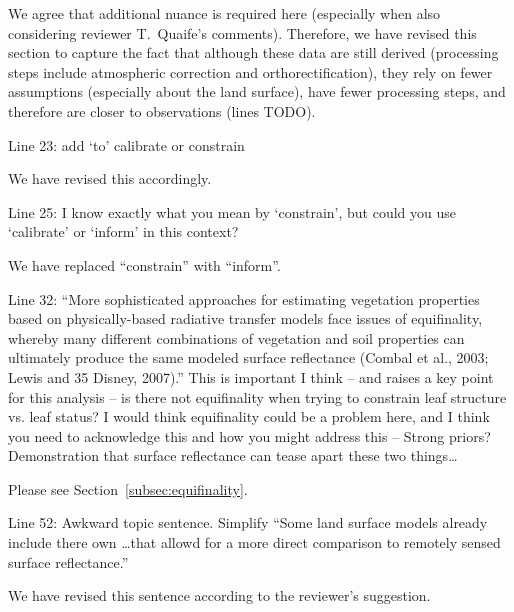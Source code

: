 We agree that additional nuance is required here (especially when also considering reviewer T.\ Quaife’s comments).
Therefore, we have revised this section to capture the fact that although these data are still derived (processing steps include atmospheric correction and orthorectification), they rely on fewer assumptions (especially about the land surface), have fewer processing steps, and therefore are closer to observations (lines TODO).

\begin{reviewer}
  Line 23: add ‘to’ calibrate or constrain
\end{reviewer}

We have revised this accordingly.

\begin{reviewer}
  Line 25: I know exactly what you mean by ‘constrain’, but could you use ‘calibrate’ or ‘inform’ in this context?
\end{reviewer}

We have replaced ``constrain'' with ``inform''.

\begin{reviewer}
  Line 32: “More sophisticated approaches for estimating vegetation properties based on physically-based radiative transfer models face issues of equifinality, whereby many different combinations of vegetation and soil properties can ultimately produce the same modeled surface reflectance (Combal et al., 2003; Lewis and 35 Disney, 2007).”
  This is important I think – and raises a key point for this analysis – is there not equifinality when trying to constrain leaf structure vs. leaf status? I would think equifinality could be a problem here, and I think you need to acknowledge this and how you might address this – Strong priors? Demonstration that surface reflectance can tease apart these two things\ldots
\end{reviewer}

Please see Section~\ref{subsec:equifinality}.


\begin{reviewer}
  Line 52: Awkward topic sentence. Simplify “Some land surface models already include there own \ldots that allowd for a more direct comparison to remotely sensed surface reflectance.”
\end{reviewer}

We have revised this sentence according to the reviewer’s suggestion.


